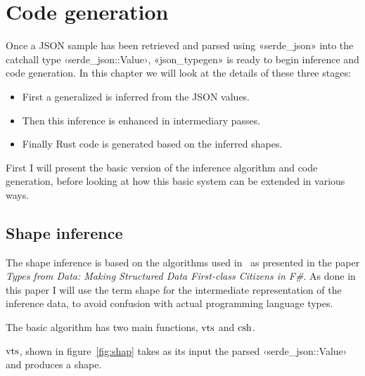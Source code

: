 
\chapter{Code generation}
\label{sec:code-generation}

Once a JSON sample has been retrieved and parsed using «serde_json» into the catchall type ‹serde_json::Value›, «json_typegen» is ready to begin inference and code generation. In this chapter we will look at the details of these three stages:

\begin{itemize}
  \item First a generalized  is inferred from the JSON values.
  \item Then this inference is enhanced in intermediary passes.
  \item Finally Rust code is generated based on the inferred shapes.
\end{itemize}

First I will present the basic version of the inference algorithm and code generation, before looking at how this basic system can be extended in various ways.

\section{Shape inference}

The shape inference is based on the algorithms used in \fsharpdata\ as presented in the paper \emph{Types from Data: Making Structured Data First-class Citizens in F\#}\cite{fsharp-types-from-data}. As done in this paper I will use the term shape for the intermediate representation of the inference data, to avoid confusion with actual programming language types.


The basic algorithm has two main functions, $\operatorname{vts}$ and $\operatorname{csh}$.

$\operatorname{vts}$, shown in figure~\ref{fig:shap} takes as its input the parsed ‹serde_json::Value› and produces a shape.

